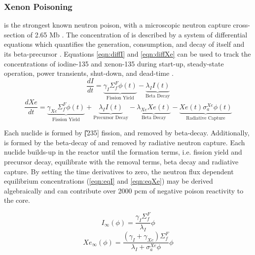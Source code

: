 \subsubsection{Xenon Poisoning}
\Xe is the strongest known neutron poison, with a microscopic neutron capture cross-section of 2.65 Mb \cite[Table II.2]{Lamarsh}. The concentration of \Xe is described by a system of differential equations which quantifies the generation, consumption, and decay of itself and its beta-precursor \I. Equations \ref{eqn:diffI} and \ref{eqn:diffXe} can be used to track the concentrations of iodine-135 and xenon-135 during start-up, steady-state operation, power transients, shut-down, and dead-time \cite[Ch. 7]{Lamarsh}.
\begin{equation}\label{eqn:diffI}
    \frac{dI}{dt} =
    \underbrace{\gamma_{I}\Sigma_{f}^{F}{\phi}(t)}_{\text{Fission Yield}}
    -\underbrace{\lambda_{I}I(t)}_{\text{Beta Decay}}
\end{equation}
\begin{equation}\label{eqn:diffXe}
        \frac{dXe}{dt} =
        \underbrace{\gamma_{Xe}\Sigma_{f}^{F}{\phi}(t)}_{\text{Fission Yield}}
        +
        \underbrace{\lambda_{I}I(t)}_{\text{Precursor Decay}}
        -
        \underbrace{\lambda_{Xe}Xe(t)}_{\text{Beta Decay}}
        -
        \underbrace{Xe(t)\sigma_{a}^{Xe}{\phi}(t)}_{\text{Radiative Capture}}
\end{equation}

Each nuclide is formed by \U[235] fission, and removed by beta-decay. Additionally, \Xe is formed by the beta-decay of \I and removed by radiative neutron capture\footnotemark. Each nuclide builds-up in the reactor until the formation terms, i.e. fission yield and precursor decay, equilibrate with the removal terms, beta decay and radiative capture. By setting the time derivatives to zero, the neutron flux dependent equilibrium concentrations (\ref{eqn:eqI} and \ref{eqn:eqXe}) may be derived algebraically \cite[Ch. 7]{Lamarsh} and can contribute over 2000 pcm of negative poison reactivity to the core. 

 
\begin{equation}\label{eqn:eqI}
    I_{\infty}(\phi) = \frac{\gamma_I \Sigma_f^F }{\lambda_I}\phi
\end{equation}
\begin{equation}\label{eqn:eqXe}
    Xe_{\infty}(\phi) = \frac{(\gamma_I+\gamma_{Xe}) \Sigma_f^F }{\lambda_I+\sigma_a^{Xe}\phi}\phi
\end{equation}

